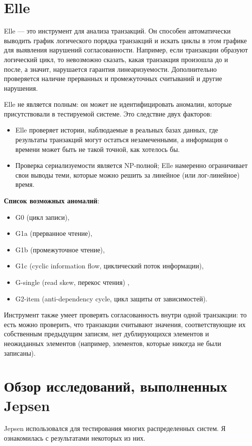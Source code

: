 \documentclass[12pt,  openany]{book}
\begin{document}
\section{Elle}
\par
Elle --- это инструмент для анализа транзакций. Он способен автоматически выводить график логического порядка транзакций и искать циклы в этом графике для выявления нарушений согласованности. Например, если транзакции образуют логический цикл, то невозможно сказать, какая транзакция произошла до и после, а значит, нарушается гарантия линеаризуемости. 
Дополнительно проверяется наличие прерванных и промежуточных считываний и другие нарушения.
\par
Elle не является полным: он может не идентифицировать аномалии, которые присутствовали в тестируемой системе. Это следствие двух факторов:
\begin{itemize}
\item Elle проверяет истории, наблюдаемые в реальных базах данных, где результаты транзакций могут остаться незамеченными, а информация о времени может быть не такой точной, как хотелось бы.
\item Проверка сериализуемости является NP-полной; Elle намеренно ограничивает свои выводы теми, которые можно решить за линейное (или лог-линейное) время.
\end{itemize}
\par
\textbf{Список возможных аномалий}:
\begin{itemize}
\item G0 (цикл записи), 
\item G1a (прерванное чтение), 
\item G1b (промежуточное чтение), 
\item G1c (cyclic information flow, циклический поток информации), 
\item G-single (read skew, перекос чтения) ,
\item G2-item (anti-dependency cycle, цикл защиты от зависимостей).
\end{itemize}
Инструмент также умеет проверять согласованность внутри одной транзакции: то есть можно проверить, что транзакции считывают значения, соответствующие их собственным предыдущим записям, нет дублирующихся элементов и неожиданных элементов (например, элементов, которые никогда не были записаны).
\section{Обзор исследований, выполненных Jepsen}
Jepsen использовался для тестирования многих распределенных систем. 
Я ознакомилась с результатами некоторых из них.
\end{document}
